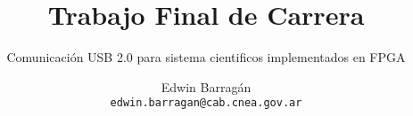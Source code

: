 \author[E. Barragán]{Edwin Barragán\\ \texttt{edwin.barragan@cab.cnea.gov.ar}}
\title{Trabajo Final de Carrera}
\subtitle{Comunicación USB 2.0 para sistema cientificos implementados en FPGA}
